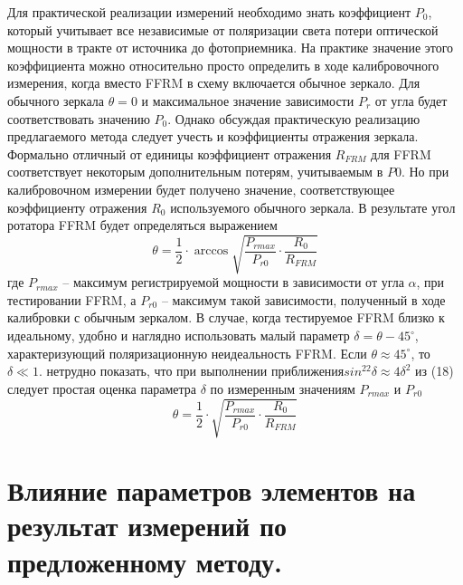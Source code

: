 \documentclass{article}
\begin{document}
Для практической реализации измерений необходимо знать коэффициент $P_0$, который учитывает все независимые от поляризации света потери оптической мощности в тракте от источника до фотоприемника.
На практике значение этого коэффициента можно относительно просто определить в ходе калибровочного измерения, когда вместо FFRM в схему включается обычное зеркало.
Для обычного зеркала $\theta = 0$ и максимальное значение зависимости $P_r$ от угла будет соответствовать значению $P_0$.
Однако обсуждая практическую реализацию предлагаемого метода следует учесть и коэффициенты отражения зеркала.
Формально отличный от единицы коэффициент отражения $R_{FRM}$ для FFRM соответствует некоторым дополнительным потерям, учитываемым в $P0$.
Но при калибровочном измерении будет получено значение, соответствующее коэффициенту отражения $R_0$ используемого обычного зеркала.
В результате угол ротатора FFRM будет определяться выражением
\begin{equation}
    \theta =\frac{1}{2}\cdot\arccos\sqrt{\frac{P_{rmax}}{P_{r0}}\cdot\frac{R_0}{R_{FRM}}}
\end{equation}
где $P_{rmax}$ – максимум регистрируемой мощности в зависимости от угла $\alpha$, при тестировании FFRM, а $P_{r0}$ – максимум такой зависимости, полученный в ходе калибровки с обычным зеркалом.    
В случае, когда тестируемое FFRM близко к идеальному, удобно и наглядно использовать малый параметр $\delta = \theta - 45^\circ$, характеризующий поляризационную неидеальность FFRM.
Если $\theta \approx 45^\circ$, то $ \delta \ll 1$. нетрудно показать, что при выполнении приближения$ sin^22\delta \approx 4\delta^2$ из (18) следует простая оценка параметра $\delta$ по измеренным значениям $P_{rmax}$ и $P_{r0}$
\begin{equation}
    \theta =\frac{1}{2}\cdot\sqrt{\frac{P_{rmax}}{P_{r0}}\cdot\frac{R_0}{R_{FRM}}}
\end{equation}


\section{Влияние параметров элементов на результат измерений по предложенному методу.}
\end{document}
